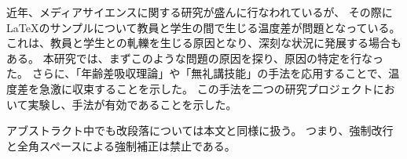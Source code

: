 近年、メディアサイエンスに関する研究が盛んに行なわれているが、
その際に \LaTeX のサンプルについて教員と学生の間で生じる温度差が問題となっている。
これは、教員と学生との軋轢を生じる原因となり、深刻な状況に発展する場合もある。
本研究では、まずこのような問題の原因を探り、原因の特定を行なった。
さらに、「年齢差吸収理論」や「無礼講技能」の手法を応用することで、温度差を急激に収束することを示した。
この手法を二つの研究プロジェクトにおいて実験し、手法が有効であることを示した。

アブストラクト中でも改段落については本文と同様に扱う。
つまり、強制改行と全角スペースによる強制補正は禁止である。
